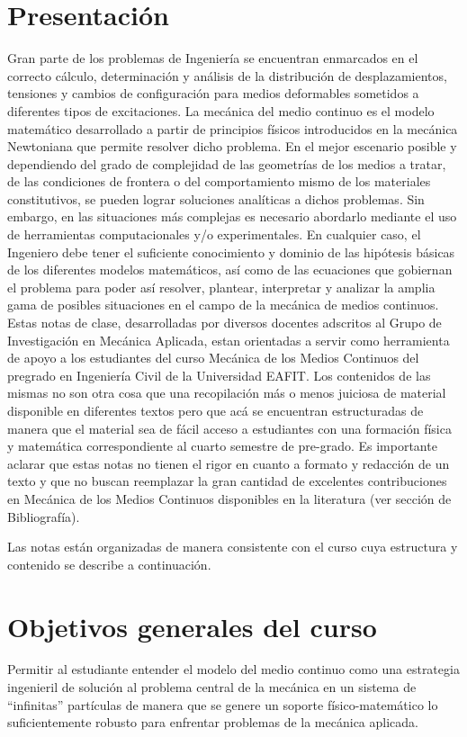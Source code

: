 %
\section*{Presentación}
%
Gran parte de los problemas de Ingeniería se encuentran enmarcados en el correcto cálculo, determinación y análisis de la distribución de desplazamientos, tensiones y cambios de configuración para medios deformables sometidos a diferentes tipos de excitaciones.  La mecánica del medio continuo es el modelo matemático desarrollado a partir de principios físicos introducidos en la mecánica Newtoniana que permite resolver dicho problema.  En el mejor escenario posible y dependiendo del grado de complejidad de las geometrías de los medios a tratar, de las condiciones de frontera o del comportamiento mismo de los materiales constitutivos, se pueden lograr soluciones analíticas a dichos problemas.  Sin embargo, en las situaciones más complejas es necesario abordarlo mediante el uso de herramientas computacionales y/o experimentales.  En cualquier caso, el Ingeniero debe tener el suficiente conocimiento y dominio de las hipótesis básicas de los diferentes modelos matemáticos, así como de las ecuaciones que gobiernan el problema para poder así resolver, plantear, interpretar y analizar la amplia gama de posibles situaciones en el campo de la mecánica de medios continuos.
%
Estas notas de clase, desarrolladas por diversos docentes adscritos al Grupo de Investigación en Mecánica Aplicada, estan orientadas a servir como herramienta de apoyo a los estudiantes del curso Mecánica de los Medios Continuos del pregrado en Ingeniería Civil de la Universidad EAFIT. Los contenidos de las mismas no son otra cosa que una recopilación más o menos juiciosa de material disponible en diferentes textos pero que acá se encuentran estructuradas de manera que el material sea de fácil acceso a estudiantes con una formación física y matemática correspondiente al cuarto semestre de pre-grado. Es importante aclarar que estas notas no tienen el rigor en cuanto a formato y redacción de un texto y que no buscan reemplazar la gran cantidad de excelentes contribuciones en Mecánica de los Medios Continuos disponibles en la literatura (ver sección de Bibliografía).

Las notas están organizadas de manera consistente con el curso cuya estructura y contenido se describe a continuación. 
%
\section*{Objetivos generales del curso}
%
Permitir al estudiante entender el modelo del medio continuo como una estrategia ingenieril de solución al problema central de la mecánica en un sistema de ``infinitas” partículas de manera que se genere un soporte físico-matemático lo suficientemente robusto para enfrentar problemas de la mecánica aplicada.
%
%
